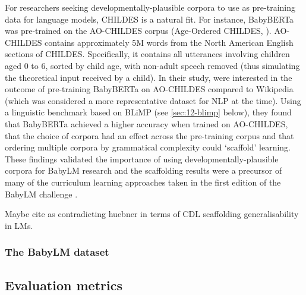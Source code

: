 For researchers seeking developmentally-plausible corpora to use as pre-training data for language models, CHILDES is a natural fit. For instance, BabyBERTa was pre-trained on the AO-CHILDES corpus (Age-Ordered CHILDES, \citep{huebner2021using}). AO-CHILDES contains approximately 5M words from the North American English sections of CHILDES. Specifically, it contains all utterances involving children aged 0 to 6, sorted by child age, with non-adult speech removed (thus simulating the theoretical input received by a child). In their study, \citet{huebner-etal-2021-babyberta} were interested in the outcome of pre-training BabyBERTa on AO-CHILDES compared to Wikipedia (which was considered a more representative dataset for NLP at the time). Using a linguistic benchmark based on BLiMP (see \cref{sec:12-blimp} below), they found that BabyBERTa achieved a higher accuracy when trained on AO-CHILDES, that the choice of corpora had an effect across the pre-training corpus and that ordering multiple corpora by grammatical complexity could `scaffold' learning. These findings validated the importance of using developmentally-plausible corpora for BabyLM research and the scaffolding results were a precursor of many of the curriculum learning approaches taken in the first edition of the BabyLM challenge \addcites.


Maybe cite \citep{padovani2025child} as contradicting huebner in terms of CDL scaffolding generalisability in LMs.



\subsubsection{The BabyLM dataset}


\subsection{Evaluation metrics}

